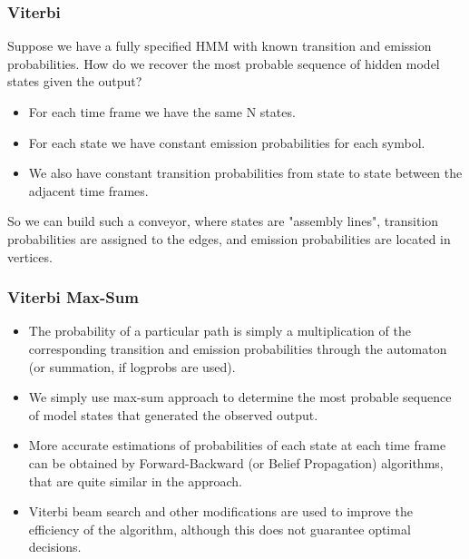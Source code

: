\documentclass{beamer}
\newcommand{\<}{\langle}
\renewcommand{\>}{\rangle}
\begin{document}
\begin{frame}
  \frametitle{Viterbi}
  Suppose we have a fully specified HMM with known transition and emission probabilities. How do we recover the most probable sequence of hidden model states given the output?
    \begin{itemize}
  \item For each time frame we have the same N states.
  \item For each state we have constant emission probabilities for each symbol.
  \item We also have constant transition probabilities from state to state between the adjacent time frames.
  \end{itemize}
So we can build such a conveyor, where states are "assembly lines", transition probabilities are assigned to the edges, and emission probabilities are located in vertices.
\end{frame}

\begin{frame}
  \frametitle{Viterbi Max-Sum}
      \begin{itemize}
\item The probability of a particular path is simply a multiplication of the corresponding transition and emission probabilities through the automaton (or summation, if logprobs are used).
\item We simply use max-sum approach to determine the most probable sequence of model states that generated the observed output.
\item More accurate estimations of probabilities of each state at each time frame can be obtained by Forward-Backward (or Belief Propagation) algorithms, that are quite similar in the approach.
\item Viterbi beam search and other modifications are used to improve the efficiency of the algorithm, although this does not guarantee optimal decisions.
  \end{itemize}
\end{frame}
\end{document}
